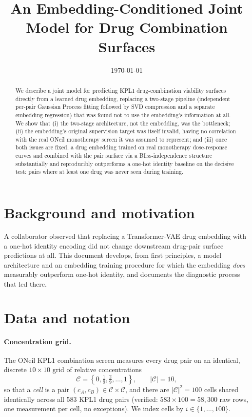 \documentclass[11pt]{article}
\title{An Embedding-Conditioned Joint Model for Drug Combination Surfaces}
\author{}
\date{\today}
\begin{document}
\maketitle

\begin{abstract}
We describe a joint model for predicting KPL1 drug-combination viability surfaces directly from a learned drug embedding, replacing a two-stage pipeline (independent per-pair Gaussian Process fitting followed by SVD compression and a separate embedding regression) that was found not to use the embedding's information at all. We show that (i) the two-stage architecture, not the embedding, was the bottleneck; (ii) the embedding's original supervision target was itself invalid, having no correlation with the real ONeil monotherapy screen it was assumed to represent; and (iii) once both issues are fixed, a drug embedding trained on real monotherapy dose-response curves and combined with the pair surface via a Bliss-independence structure substantially and reproducibly outperforms a one-hot identity baseline on the decisive test: pairs where at least one drug was never seen during training.
\end{abstract}

\section{Background and motivation}

A collaborator observed that replacing a Transformer-VAE drug embedding with a one-hot identity encoding did not change downstream drug-pair surface predictions at all. This document develops, from first principles, a model architecture and an embedding training procedure for which the embedding \emph{does} measurably outperform one-hot identity, and documents the diagnostic process that led there.

\section{Data and notation}

\paragraph{Concentration grid.} The ONeil KPL1 combination screen measures every drug pair on an identical, discrete $10\times10$ grid of relative concentrations
\[
\mathcal{C} = \left\{0, \tfrac{1}{9}, \tfrac{2}{9}, \ldots, 1\right\}, \qquad |\mathcal{C}| = 10,
\]
so that a \emph{cell} is a pair $(c_A, c_B) \in \mathcal{C} \times \mathcal{C}$, and there are $|\mathcal{C}|^2 = 100$ cells shared identically across all 583 KPL1 drug pairs (verified: $583 \times 100 = 58{,}300$ raw rows, one measurement per cell, no exceptions). We index cells by $i \in \{1, \ldots, 100\}$.
\end{document}
